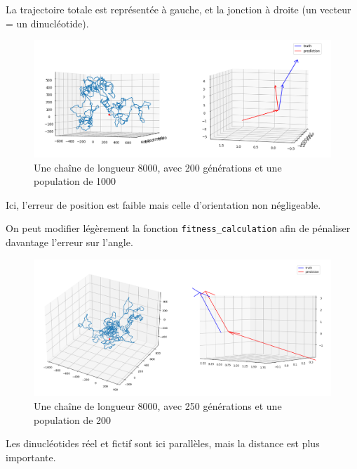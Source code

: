 \documentclass[graphics]{beamer}
\begin{document}
\begin{frame}
	La trajectoire totale est représentée à gauche, et la jonction à droite (un vecteur = un dinucléotide).
	\begin{figure}[H]
		\centering
		\includegraphics[scale=0.3]{8k_200gen_1000pop_tour0.3_mut0.7_1.038}
		\caption{Une chaîne de longueur 8000, avec 200 générations et une population de 1000}
	\end{figure}
	Ici, l'erreur de position est faible mais celle d'orientation non négligeable.
\end{frame}

\begin{frame}
	On peut modifier légèrement la fonction \texttt{fitness_calculation} afin de pénaliser davantage l'erreur sur l'angle.
	\begin{figure}[H]
		\centering
		\includegraphics[scale=0.25]{250gen200pop0.3_0.003_0.7_0.003alpha=10}
		\caption{Une chaîne de longueur 8000, avec 250 générations et une population de 200}
	\end{figure}
	Les dinucléotides réel et fictif sont ici parallèles, mais la distance est plus importante.
\end{frame}
\end{document}
